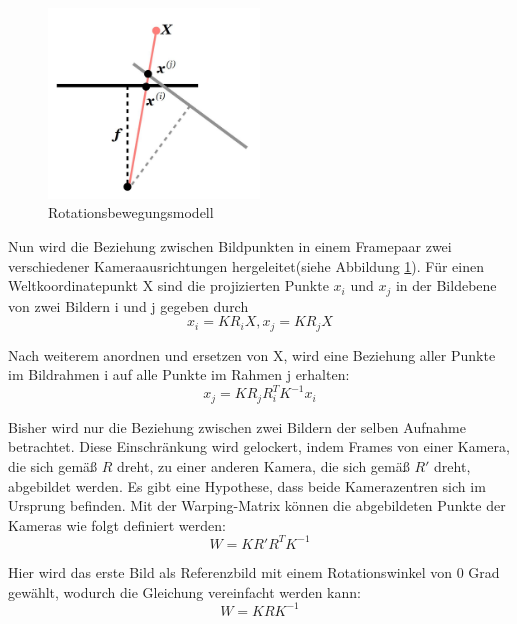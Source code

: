 \begin{figure}[H]
 \centering 
 \includegraphics[keepaspectratio,width=0.5\textwidth]{images/3_Ersteverfahren/Kamera/rotationsmodel.pdf}
 \caption{Rotationsbewegungsmodell}
 \label{fig:rotationsmodel}
\end{figure} 

Nun wird die Beziehung zwischen Bildpunkten in einem Framepaar zwei verschiedener Kameraausrichtungen hergeleitet(siehe Abbildung \ref{fig:rotationsmodel}). Für einen Weltkoordinatepunkt X sind die projizierten Punkte $x_i$ und $x_j$ in der Bildebene von zwei Bildern i und j gegeben durch
\begin{equation}
   x_i = KR_iX, x_j = KR_jX
\end{equation}

Nach weiterem anordnen und ersetzen von X, wird eine Beziehung aller Punkte im Bildrahmen i auf alle Punkte im Rahmen j erhalten:
\begin{equation}
   x_j = KR_jR_i^TK^{-1}x_i
\end{equation}

Bisher wird nur die Beziehung zwischen zwei Bildern der selben Aufnahme betrachtet. Diese Einschränkung wird gelockert, indem Frames von einer Kamera, die sich gemäß $R$ dreht, zu einer anderen Kamera, die sich gemäß $R'$ dreht, abgebildet werden. Es gibt eine Hypothese, dass beide Kamerazentren sich im Ursprung befinden. Mit der Warping-Matrix können die abgebildeten Punkte der Kameras wie folgt definiert werden:
\begin{equation}
   W = KR'R^TK^{-1}
\end{equation}

Hier wird das erste Bild als Referenzbild mit einem Rotationswinkel von 0 Grad gewählt, wodurch die Gleichung vereinfacht werden kann:
\begin{equation}
   W = KRK^{-1}
\end{equation}

